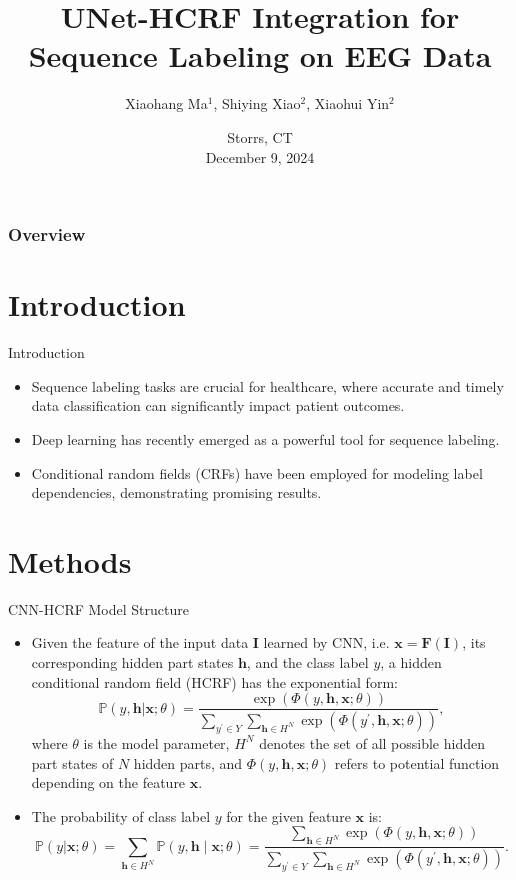 \documentclass[leqno]{beamer}
\title[\textcolor{black}{UNet-HCRF\_EEG}]{\large
UNet-HCRF Integration for Sequence Labeling on EEG Data}
\author[\scalebox{.85}{Xiaohang Ma, Shiying Xiao, Xiaohui Yin}]
{Xiaohang Ma$^1$, Shiying Xiao$^2$, Xiaohui Yin$^2$}
\institute[\scalebox{.85}{UConn}]
{$^1$Department of Mathematics, University of Connecticut \\
$^2$Department of Statistics, University of Connecticut}
\date[December 9, 2024]{
{\small Storrs, CT} \\
{\small December 9, 2024}}
\newcommand{\PP}{{\mathbb{P}}}
\newcommand{\Fb}{\mathbf{F}}
\newcommand{\Ib}{\mathbf{I}}
\newcommand{\hb}{\mathbf{h}}
\newcommand{\xb}{\mathbf{x}}
\begin{document}
\begin{frame}[plain]
\titlepage
\end{frame}


\begin{frame}
\frametitle{Overview}
\tableofcontents
\end{frame}


\section[Introduction]{Introduction}


\begin{frame}{Introduction}
\begin{itemize}
\setlength{\itemsep}{1.5em}
\item Sequence labeling tasks are crucial for healthcare, where accurate and
timely data classification can significantly impact patient outcomes.
\item Deep learning has recently emerged as a powerful tool for sequence
labeling.
\item Conditional random fields (CRFs) have been employed for modeling label
dependencies, demonstrating promising results.
\end{itemize}
\end{frame}


\section[Methods]{Methods}


\begin{frame}{CNN-HCRF Model Structure}
\begin{itemize}
\item Given the feature of the input data $\Ib$ learned by CNN, i.e.
$\xb = \Fb(\Ib)$, its corresponding hidden part states $\hb$, and the class
label $y$, a hidden conditional random field (HCRF) has the exponential form:
\begin{equation*}
\PP(y, \hb \vert \xb; \theta)
= \frac{\exp\left(\Phi(y, \hb, \xb; \theta)\right)}
{\sum_{y^\prime \in Y} \sum_{\hb \in H^N}
\exp\left(\Phi(y^\prime, \hb, \xb; \theta)\right)},
\end{equation*}
where $\theta$ is the model parameter, $H^N$ denotes the set of all possible
hidden part states of $N$ hidden parts, and $\Phi(y, \hb, \xb; \theta)$
refers to potential function depending on the feature $\xb$.
\item The probability of class label $y$ for the given feature $\xb$ is:
\begin{equation*}
\PP(y \vert \xb; \theta) = \sum_{\hb \in H^N} \PP(y, \hb \mid \xb; \theta)
= \frac{\sum_{\hb \in H^N} \exp\left(\Phi(y, \hb, \xb; \theta)\right)}
{\sum_{y^\prime \in Y} \sum_{\hb \in H^N}
\exp\left(\Phi(y^\prime, \hb, \xb; \theta)\right)}.
\end{equation*}
\end{itemize}
\end{frame}
\end{document}
